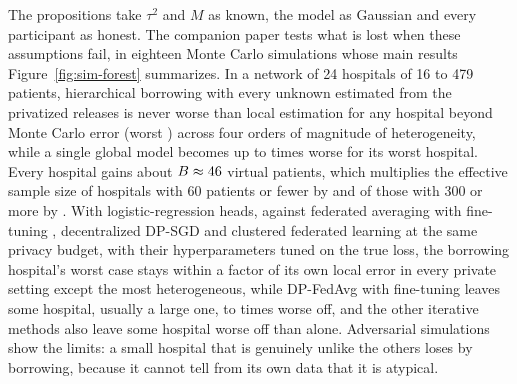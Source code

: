 \documentclass[acmsmall,screen,review]{acmart}
\theoremstyle{acmdefinition}
\begin{document}
The propositions take $\tau^2$ and $M$ as known, the model as Gaussian and every participant as honest. The companion paper \cite{simoes2026ghb} tests what is lost when these assumptions fail, in eighteen Monte Carlo simulations whose main results Figure~\ref{fig:sim-forest} summarizes. In a network of 24 hospitals of 16 to 479 patients, hierarchical borrowing with every unknown estimated from the privatized releases is never worse than local estimation for any hospital beyond Monte Carlo error (worst \SimTwoWorstGHB) across four orders of magnitude of heterogeneity, while a single global model becomes up to \SimTwoWorstPool{} times worse for its worst hospital. Every hospital gains about $B\approx46$ virtual patients, which multiplies the effective sample size of hospitals with 60 patients or fewer by \SimThreeSmall{} and of those with 300 or more by \SimThreeLarge. With logistic-regression heads, against federated averaging with fine-tuning \cite{mcmahan2018learning}, decentralized DP-SGD \cite{lian2017can} and clustered federated learning \cite{ghosh2020efficient} at the same privacy budget, with their hyperparameters tuned on the true loss, the borrowing hospital's worst case stays within a factor \SimFifteenGHBWorstMax{} of its own local error in every private setting except the most heterogeneous, while DP-FedAvg \cite{mcmahan2018learning} with fine-tuning leaves some hospital, usually a large one, \SimFifteenFTWorstMin{} to \SimFifteenFTWorstMax{} times worse off, and the other iterative methods also leave some hospital worse off than alone. Adversarial simulations show the limits: a small hospital that is genuinely unlike the others loses by borrowing, because it cannot tell from its own data that it is atypical.
\end{document}
